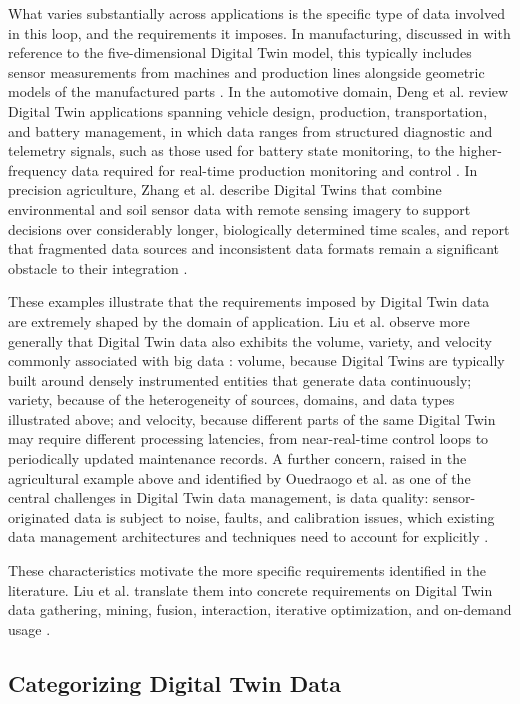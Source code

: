 What varies substantially across applications is the specific type of data involved in this loop, and the requirements it imposes. In manufacturing, discussed in  with reference to the five-dimensional Digital Twin model, this typically includes sensor measurements from machines and production lines alongside geometric models of the manufactured parts \cite{tao2022}. In the automotive domain, Deng et al. review Digital Twin applications spanning vehicle design, production, transportation, and battery management, in which data ranges from structured diagnostic and telemetry signals, such as those used for battery state monitoring, to the higher-frequency data required for real-time production monitoring and control \cite{deng2023automotive}. In precision agriculture, Zhang et al. describe Digital Twins that combine environmental and soil sensor data with remote sensing imagery to support decisions over considerably longer, biologically determined time scales, and report that fragmented data sources and inconsistent data formats remain a significant obstacle to their integration \cite{zhang2025agriculture}.

These examples illustrate that the requirements imposed by Digital Twin data are extremely shaped by the domain of application. Liu et al. observe more generally that Digital Twin data also exhibits the volume, variety, and velocity commonly associated with big data \cite{liu2022dtd}: volume, because Digital Twins are typically built around densely instrumented entities that generate data continuously; variety, because of the heterogeneity of sources, domains, and data types illustrated above; and velocity, because different parts of the same Digital Twin may require different processing latencies, from near-real-time control loops to periodically updated maintenance records. A further concern, raised in the agricultural example above and identified by Ouedraogo et al. as one of the central challenges in Digital Twin data management, is data quality: sensor-originated data is subject to noise, faults, and calibration issues, which existing data management architectures and techniques need to account for explicitly \cite{ouedraogo2025dtdm}.

These characteristics motivate the more specific requirements identified in the literature. Liu et al. translate them into concrete requirements on Digital Twin data gathering, mining, fusion, interaction, iterative optimization, and on-demand usage \cite{liu2022dtd}.

\subsection{Categorizing Digital Twin Data}
\label{sec:dt_data_categories}

